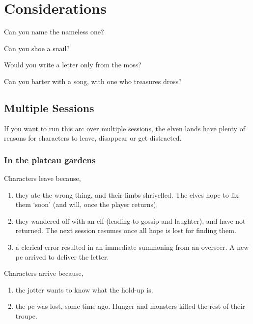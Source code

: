 \section{Considerations}

\begin{exampletext}
  Can you name the nameless one?

  Can you shoe a snail?

  Would you write a letter only from the moss?

  Can you barter with a song, with one who treasures dross?
\end{exampletext}

\begin{multicols}{2}

\subsection{Multiple Sessions}

If you want to run this arc over multiple sessions, the elven lands have plenty of reasons for characters to leave, disappear or get distracted.

\subsubsection{In the plateau gardens}

Characters leave because,


\begin{enumerate}
  \item
  they ate the wrong thing, and their limbs shrivelled.
  The elves hope to fix them `soon' (and will, once the player returns).
  \item
  they wandered off with an elf (leading to gossip and laughter), and have not returned.
  The next session resumes once all hope is lost for finding them.
  \item
  a clerical error resulted in an immediate summoning from an overseer.
  A new \gls{pc} arrived to deliver the letter.
\end{enumerate}

Characters arrive because,

\begin{enumerate}
  \item
  the \gls{jotter} wants to know what the hold-up is.
  \item
  the \gls{pc} was lost, some time ago.
  Hunger and monsters killed the rest of their troupe.
\end{enumerate}


\end{multicols}
